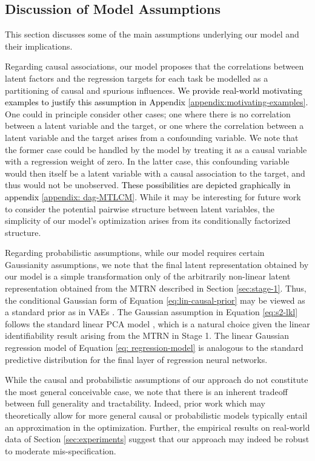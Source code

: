 \documentclass[10pt]{article} %
\theoremstyle{plain}
\theoremstyle{definition}
\begin{document}
\subsection{Discussion of Model Assumptions}\label{sec:assumptions}
This section discusses some of the main assumptions underlying our model and their implications.

Regarding causal associations, our model proposes that the correlations between latent factors and the regression targets for each task be modelled as a partitioning of causal and spurious influences. \textcolor{black}{We provide real-world motivating examples to justify this assumption in Appendix \ref{appendix:motivating-examples}.} One could in principle consider other cases; one where there is no correlation between a latent variable and the target, or one where the correlation between a latent variable and the target arises from a confounding variable. We note that the former case could be handled by the model by treating it as a causal variable with a regression weight of zero. In the latter case, this confounding variable would then itself be a latent variable with a causal association to the target, and thus would not be unobserved. \textcolor{black}{These possibilities are depicted graphically in appendix \ref{appendix: dag-MTLCM}}. While it may be interesting for future work to consider the potential pairwise structure between latent variables, the simplicity of our model's optimization arises from its conditionally factorized structure.

Regarding probabilistic assumptions, while our model requires certain Gaussianity assumptions, we note that the final latent representation obtained by our model is a simple transformation only of the arbitrarily non-linear latent representation obtained from the MTRN described in Section \ref{sec:stage-1}. Thus, the conditional Gaussian form of Equation \eqref{eq:lin-causal-prior} may be viewed as a standard prior as in VAEs \citep{kingma2013auto}. The Gaussian assumption in Equation \eqref{eq:s2-lkl} follows the standard linear PCA model \citep{tipping1999probabilistic}, which is a natural choice given the linear identifiability result arising from the MTRN in Stage 1. The linear Gaussian regression model of Equation \eqref{eq: regression-model} is analogous to the standard predictive distribution for the final layer of regression neural networks. 

While the causal and probabilistic assumptions of our approach do not constitute the most general conceivable case, we note that there is an inherent tradeoff between full generality and tractability. Indeed, prior work which may theoretically allow for more general causal or probabilistic models typically entail an approximation in the optimization. Further, the empirical results on real-world data of Section \ref{sec:experiments} suggest that our approach may indeed be robust to moderate mis-specification.
\end{document}
